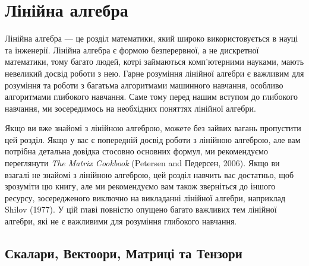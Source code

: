 \chapter{Лінійна алгебра}
\label{chap:commentary}

Лінійна алгебра — це розділ математики, який широко використовується в науці
та інженерії. Лінійна алгебра є формою безперервної, а не
дискретної математики, тому багато людей, котрі займаються комп'ютерними науками, мають невеликий досвід роботи з нею.
Гарне розуміння лінійної алгебри є важливим для розуміння та роботи
з багатьма алгоритмами машинного навчання, особливо алгоритмами глибокого навчання.
Саме тому перед нашим вступом до глибокого навчання, ми зосередимось на необхідних поняттях лінійної алгебри.

Якщо ви вже знайомі з лінійною алгеброю, можете без зайвих вагань пропустити цей розділ. Якщо
у вас є попередній досвід роботи з лінійною алгеброю, але вам потрібна детальна довідка
стосовно основних формул, ми рекомендуємо переглянути \textit{The Matrix Cookbook} ({\color{green}Petersen and
Педерсен, 2006}). Якщо ви взагалі не знайомі з лінійною алгеброю, цей розділ
навчить вас достатньо, щоб зрозуміти цю книгу, але ми рекомендуємо вам також
зверніться до іншого ресурсу, зосередженого виключно на викладанні лінійної алгебри, наприклад
{\color{green}Shilov (1977)}. У цій главі повністю опущено багато важливих тем лінійної алгебри,
які не є важливими для розуміння глибокого навчання.

\section{Скалари, Вектоори, Матриці та Тензори}
\label{sec:definitions}

